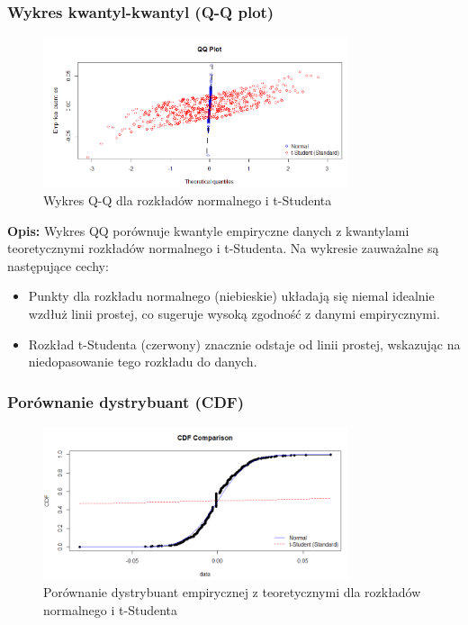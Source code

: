 \documentclass[a4paper,11pt]{article}
\begin{document}
\subsubsection{Wykres kwantyl-kwantyl (Q-Q plot)}

\begin{figure}[H]
    \centering
    \includegraphics[width=0.8\textwidth]{./Wojtek/wykres-kwantyl-kwantyl.png}
    \caption{Wykres Q-Q dla rozkładów normalnego i t-Studenta}
    \label{fig:qq_plot}
\end{figure}

\textbf{Opis:} Wykres QQ porównuje kwantyle empiryczne danych z kwantylami teoretycznymi rozkładów normalnego i t-Studenta.  
Na wykresie zauważalne są następujące cechy:
\begin{itemize}
    \item Punkty dla rozkładu normalnego (niebieskie) układają się niemal idealnie wzdłuż linii prostej, co sugeruje wysoką zgodność z danymi empirycznymi.
    \item Rozkład t-Studenta (czerwony) znacznie odstaje od linii prostej, wskazując na niedopasowanie tego rozkładu do danych.
\end{itemize}

\subsubsection{Porównanie dystrybuant (CDF)}

\begin{figure}[H]
    \centering
    \includegraphics[width=0.8\textwidth]{./Wojtek/dystrybuanta-empiryczna-vs-teoretyczna.png}
    \caption{Porównanie dystrybuant empirycznej z teoretycznymi dla rozkładów normalnego i t-Studenta}
    \label{fig:dystrybuanta_vs_teoretyczna}
\end{figure}
\end{document}
